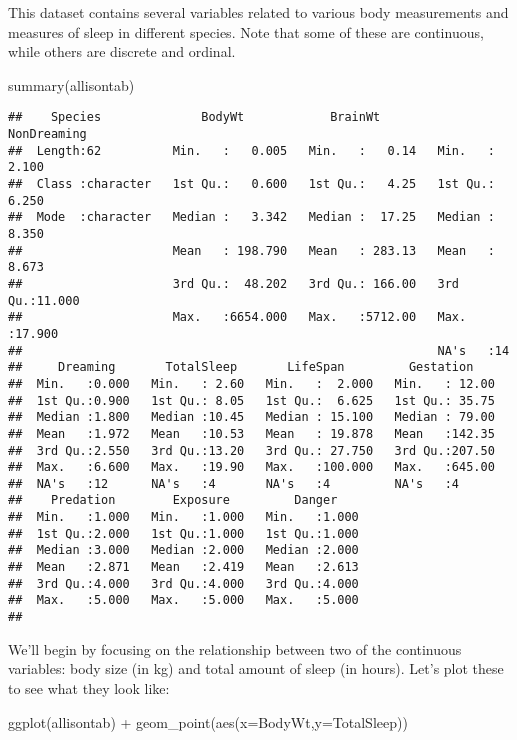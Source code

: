 \documentclass[
]{book}
\newenvironment{Shaded}{\begin{snugshade}}{\end{snugshade}}
\newcommand{\AttributeTok}[1]{\textcolor[rgb]{0.77,0.63,0.00}{#1}}
\newcommand{\FunctionTok}[1]{\textcolor[rgb]{0.00,0.00,0.00}{#1}}
\newcommand{\NormalTok}[1]{#1}
\newcommand{\SpecialCharTok}[1]{\textcolor[rgb]{0.00,0.00,0.00}{#1}}
\begin{document}
This dataset contains several variables related to various body measurements and measures of sleep in different species. Note that some of these are continuous, while others are discrete and ordinal.

\begin{Shaded}
\begin{Highlighting}[]
\FunctionTok{summary}\NormalTok{(allisontab)}
\end{Highlighting}
\end{Shaded}

\begin{verbatim}
##    Species              BodyWt            BrainWt         NonDreaming    
##  Length:62          Min.   :   0.005   Min.   :   0.14   Min.   : 2.100  
##  Class :character   1st Qu.:   0.600   1st Qu.:   4.25   1st Qu.: 6.250  
##  Mode  :character   Median :   3.342   Median :  17.25   Median : 8.350  
##                     Mean   : 198.790   Mean   : 283.13   Mean   : 8.673  
##                     3rd Qu.:  48.202   3rd Qu.: 166.00   3rd Qu.:11.000  
##                     Max.   :6654.000   Max.   :5712.00   Max.   :17.900  
##                                                          NA's   :14      
##     Dreaming       TotalSleep       LifeSpan         Gestation     
##  Min.   :0.000   Min.   : 2.60   Min.   :  2.000   Min.   : 12.00  
##  1st Qu.:0.900   1st Qu.: 8.05   1st Qu.:  6.625   1st Qu.: 35.75  
##  Median :1.800   Median :10.45   Median : 15.100   Median : 79.00  
##  Mean   :1.972   Mean   :10.53   Mean   : 19.878   Mean   :142.35  
##  3rd Qu.:2.550   3rd Qu.:13.20   3rd Qu.: 27.750   3rd Qu.:207.50  
##  Max.   :6.600   Max.   :19.90   Max.   :100.000   Max.   :645.00  
##  NA's   :12      NA's   :4       NA's   :4         NA's   :4       
##    Predation        Exposure         Danger     
##  Min.   :1.000   Min.   :1.000   Min.   :1.000  
##  1st Qu.:2.000   1st Qu.:1.000   1st Qu.:1.000  
##  Median :3.000   Median :2.000   Median :2.000  
##  Mean   :2.871   Mean   :2.419   Mean   :2.613  
##  3rd Qu.:4.000   3rd Qu.:4.000   3rd Qu.:4.000  
##  Max.   :5.000   Max.   :5.000   Max.   :5.000  
## 
\end{verbatim}

We'll begin by focusing on the relationship between two of the continuous variables: body size (in kg) and total amount of sleep (in hours). Let's plot these to see what they look like:

\begin{Shaded}
\begin{Highlighting}[]
\FunctionTok{ggplot}\NormalTok{(allisontab) }\SpecialCharTok{+} \FunctionTok{geom\_point}\NormalTok{(}\FunctionTok{aes}\NormalTok{(}\AttributeTok{x=}\NormalTok{BodyWt,}\AttributeTok{y=}\NormalTok{TotalSleep))}
\end{Highlighting}
\end{Shaded}
\end{document}
